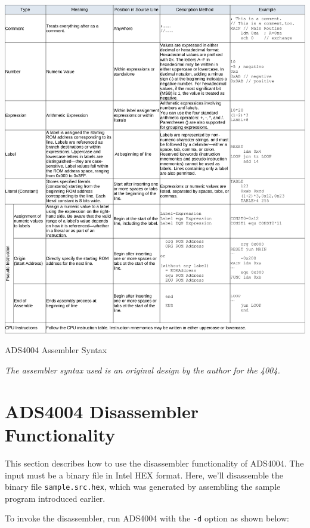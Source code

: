 \begin{table}
    \includegraphics[width=1.00\columnwidth]{./Table/ADS4004AssemblerSyntax.pdf}
    \caption{ADS4004 Assembler Syntax}
    \textit{The assembler syntax used is an original design by the author for the 4004.}
    \label{tb:ADS4004SYNTAX}
\end{table}

\section{ADS4004 Disassembler Functionality}
This section describes how to use the disassembler functionality of ADS4004.  
The input must be a binary file in Intel HEX format.  
Here, we'll disassemble the binary file \texttt{sample.src.hex}, which was generated by assembling the sample program introduced earlier.

To invoke the disassembler, run ADS4004 with the \texttt{-d} option as shown below:\\

\begin{scriptsize}
\end{scriptsize}
\\

